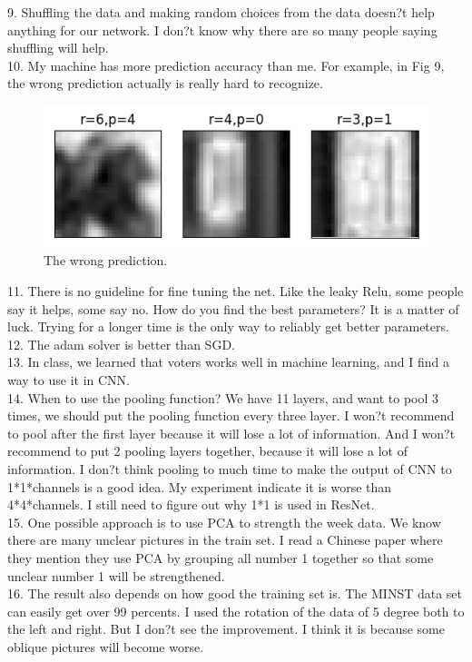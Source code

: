 \documentclass[twocolumn]{webofc}
\begin{document}
9. Shuffling the data and making random choices from the data doesn?t help anything for our network. I don?t know why there are so many people saying shuffling will help. \\
10. My machine has more prediction accuracy than me. For example, in Fig 9, the wrong prediction actually is really hard to recognize.\\
\begin{figure}[H]
  \centering
  \includegraphics[width=0.6\columnwidth]{wrong.png}
  \caption{The wrong prediction.}
\end{figure}
11. There is no guideline for fine tuning the net. Like the leaky Relu, some people say it helps, some say no. How do you find the best parameters? It is a matter of luck. Trying for a longer time is the only way to reliably get better parameters. \\
12. The adam solver is better than SGD. \\
13. In class, we learned that voters works well in machine learning, and I find a way to use it in CNN. \\
14. When to use the pooling function? We have 11 layers, and want to pool 3 times, we should put the pooling function\cite{Zeiler2013} every three layer. I won?t recommend to pool after the first layer because it will lose a lot of information. And I won?t recommend to put 2 pooling layers together, because it will lose a lot of information. I don?t think pooling to much time to make the output of CNN to 1*1*channels is a good idea. My experiment indicate it is worse than 4*4*channels. I still need to figure out why 1*1 is used in ResNet. \\
15. One possible approach is to use PCA to strength the week data. We know there are many unclear pictures in the train set. I read a Chinese paper where they mention they use PCA by grouping all number 1 together so that some unclear number 1 will be strengthened. \\
16. The result also depends on how good the training set is. The MINST data set can easily get over 99 percents. I used the rotation of the data of 5 degree both to the left and right. But I don?t see the improvement. I think it is because some oblique pictures will become worse. \\
\end{document}
